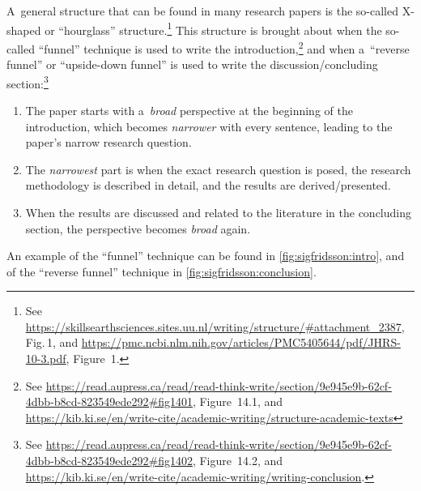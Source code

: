 A~general structure that can be found in many research papers is the so-called X-shaped or ``hourglass'' structure.\footnote{See \url{https://skillsearthsciences.sites.uu.nl/writing/structure/\#attachment_2387}, Fig.\,1, and \url{https://pmc.ncbi.nlm.nih.gov/articles/PMC5405644/pdf/JHRS-10-3.pdf}, Figure~1.} This structure is brought about when the so-called ``funnel'' technique is used to write the introduction,\footnote{See  \url{https://read.aupress.ca/read/read-think-write/section/9e945e9b-62cf-4dbb-b8cd-823549ede292\#fig1401}, Figure~14.1, and \url{https://kib.ki.se/en/write-cite/academic-writing/structure-academic-texts}} and when a~``reverse funnel'' or ``upside-down funnel'' is used to write the discussion\slash concluding section:\footnote{See \url{https://read.aupress.ca/read/read-think-write/section/9e945e9b-62cf-4dbb-b8cd-823549ede292\#fig1402}, Figure~14.2, and \url{https://kib.ki.se/en/write-cite/academic-writing/writing-conclusion}.}
\begin{enumerate}
	\item The paper starts with a~\emph{broad} perspective at the beginning of the introduction, which becomes \emph{narrower} with every sentence, leading to the paper's narrow research question.
	\item The \emph{narrowest} part is when the exact research question is posed, the research methodology is described in detail, and the results are derived\slash presented.
	\item When the results are discussed and related to the literature in the concluding section, the perspective becomes \emph{broad} again.
\end{enumerate}

An example of the ``funnel'' technique can be found in \autoref{fig:sigfridsson:intro}, and of the ``reverse funnel'' technique in \autoref{fig:sigfridsson:conclusion}.

\begingroup


